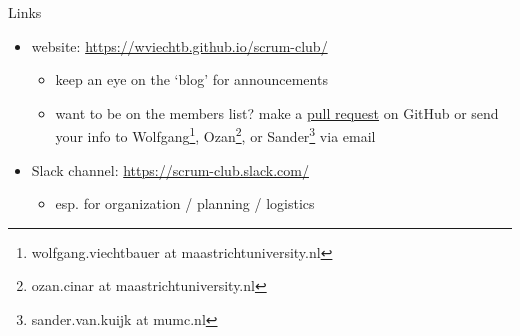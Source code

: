 \documentclass[t,12pt]{beamer}
\begin{document}
\begin{frame}{Links}

\begin{itemize}
   \item website: {\footnotesize \url{https://wviechtb.github.io/scrum-club/}}
   \begin{itemize}
      \item keep an eye on the `blog' for announcements
      \item want to be on the members list? make a \href{https://help.github.com/articles/about-pull-requests/}{pull request} on GitHub or send your info to Wolfgang\footnote{wolfgang.viechtbauer at maastrichtuniversity.nl}, Ozan\footnote{ozan.cinar at maastrichtuniversity.nl}, or Sander\footnote{sander.van.kuijk at mumc.nl} via email
   \end{itemize}
   \item Slack channel: {\footnotesize \url{https://scrum-club.slack.com/}}
   \begin{itemize}
      \item esp. for organization / planning / logistics
   \end{itemize}
\end{itemize}

\end{frame}

\end{document}
